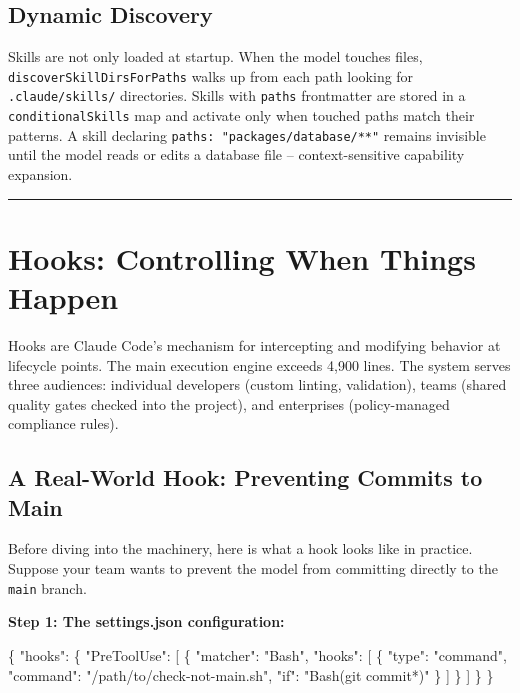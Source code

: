 \documentclass[
  english,
  11pt,
  letterpaper,
]{book}
\newenvironment{Shaded}{\begin{snugshade}}{\end{snugshade}}
\newcommand{\DataTypeTok}[1]{\textcolor[rgb]{0.68,0.00,0.00}{#1}}
\newcommand{\FunctionTok}[1]{\textcolor[rgb]{0.28,0.35,0.67}{#1}}
\newcommand{\OtherTok}[1]{\textcolor[rgb]{0.00,0.23,0.31}{#1}}
\newcommand{\StringTok}[1]{\textcolor[rgb]{0.13,0.47,0.30}{#1}}
\begin{document}
\subsection{Dynamic Discovery}\label{dynamic-discovery}

Skills are not only loaded at startup. When the model touches files,
\texttt{discoverSkillDirsForPaths} walks up from each path looking for
\texttt{.claude/skills/} directories. Skills with \texttt{paths}
frontmatter are stored in a \texttt{conditionalSkills} map and activate
only when touched paths match their patterns. A skill declaring
\texttt{paths:\ "packages/database/**"} remains invisible until the
model reads or edits a database file -- context-sensitive capability
expansion.

\begin{center}\rule{0.5\linewidth}{0.5pt}\end{center}

\section{Hooks: Controlling When Things
Happen}\label{hooks-controlling-when-things-happen}

Hooks are Claude Code's mechanism for intercepting and modifying
behavior at lifecycle points. The main execution engine exceeds 4,900
lines. The system serves three audiences: individual developers (custom
linting, validation), teams (shared quality gates checked into the
project), and enterprises (policy-managed compliance rules).

\subsection{A Real-World Hook: Preventing Commits to
Main}\label{a-real-world-hook-preventing-commits-to-main}

Before diving into the machinery, here is what a hook looks like in
practice. Suppose your team wants to prevent the model from committing
directly to the \texttt{main} branch.

\textbf{Step 1: The settings.json configuration:}

\begin{Shaded}
\begin{Highlighting}[]
\FunctionTok{\{}
  \DataTypeTok{"hooks"}\FunctionTok{:} \FunctionTok{\{}
    \DataTypeTok{"PreToolUse"}\FunctionTok{:} \OtherTok{[}
      \FunctionTok{\{}
        \DataTypeTok{"matcher"}\FunctionTok{:} \StringTok{"Bash"}\FunctionTok{,}
        \DataTypeTok{"hooks"}\FunctionTok{:} \OtherTok{[}
          \FunctionTok{\{}
            \DataTypeTok{"type"}\FunctionTok{:} \StringTok{"command"}\FunctionTok{,}
            \DataTypeTok{"command"}\FunctionTok{:} \StringTok{"/path/to/check{-}not{-}main.sh"}\FunctionTok{,}
            \DataTypeTok{"if"}\FunctionTok{:} \StringTok{"Bash(git commit*)"}
          \FunctionTok{\}}
        \OtherTok{]}
      \FunctionTok{\}}
    \OtherTok{]}
  \FunctionTok{\}}
\FunctionTok{\}}
\end{Highlighting}
\end{Shaded}
\end{document}
